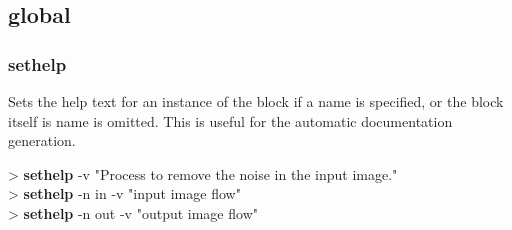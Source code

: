 \documentclass[10pt,a4paper]{article}
\begin{document}
\subsection{global}
\subsubsection{sethelp}

Sets the help text for an instance of the block if a name is specified, or the block itself is name is omitted. This is useful for the automatic documentation generation. \\


\begin{sampletitle}
> \textbf{\tool{} sethelp} -v "Process to remove the noise in the input image." \\
> \textbf{\tool{} sethelp} -n in -v "input image flow" \\
> \textbf{\tool{} sethelp} -n out -v "output image flow"
\end{sampletitle}
\end{document}
